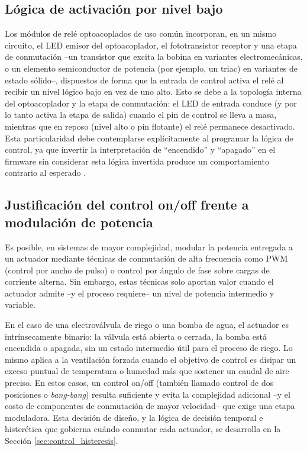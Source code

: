 \subsection{Lógica de activación por nivel bajo}
\label{subsec:activo_bajo}

Los módulos de relé optoacoplados de uso común incorporan, en un mismo circuito, el LED emisor del optoacoplador, el fototransistor receptor y una etapa de conmutación --un transistor que excita la bobina en variantes electromecánicas, o un elemento semiconductor de potencia (por ejemplo, un triac) en variantes de estado sólido--, dispuestos de forma que la entrada de control activa el relé al recibir un nivel lógico bajo en vez de uno alto. Esto se debe a la topología interna del optoacoplador y la etapa de conmutación: el LED de entrada conduce (y por lo tanto activa la etapa de salida) cuando el pin de control se lleva a masa, mientras que en reposo (nivel alto o pin flotante) el relé permanece desactivado. Esta particularidad debe contemplarse explícitamente al programar la lógica de control, ya que invertir la interpretación de ``encendido'' y ``apagado'' en el firmware sin considerar esta lógica invertida produce un comportamiento contrario al esperado \cite{activo_bajo_robots_arg}.

\subsection{Justificación del control on/off frente a modulación de potencia}
\label{subsec:onoff_vs_pwm}

Es posible, en sistemas de mayor complejidad, modular la potencia entregada a un actuador mediante técnicas de conmutación de alta frecuencia como PWM (control por ancho de pulso) o control por ángulo de fase sobre cargas de corriente alterna. Sin embargo, estas técnicas solo aportan valor cuando el actuador admite --y el proceso requiere-- un nivel de potencia intermedio y variable.

En el caso de una electroválvula de riego o una bomba de agua, el actuador es intrínsecamente binario: la válvula está abierta o cerrada, la bomba está encendida o apagada, sin un estado intermedio útil para el proceso de riego. Lo mismo aplica a la ventilación forzada cuando el objetivo de control es disipar un exceso puntual de temperatura o humedad más que sostener un caudal de aire preciso. En estos casos, un control on/off (también llamado control de dos posiciones o \textit{bang-bang}) resulta suficiente y evita la complejidad adicional --y el costo de componentes de conmutación de mayor velocidad-- que exige una etapa moduladora. Esta decisión de diseño, y la lógica de decisión temporal e histerética que gobierna cuándo conmutar cada actuador, se desarrolla en la Sección \ref{sec:control_histeresis}.

